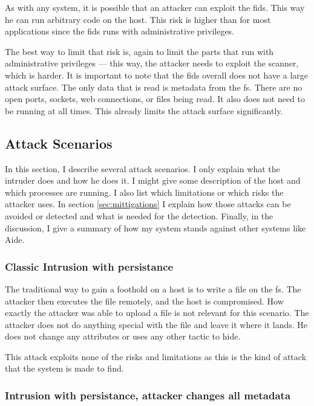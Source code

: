 As with any system, it is possible that an attacker can exploit the \gls{fids}. This way he can run arbitrary code on the host. This risk is higher than for most applications since the \gls{fids} runs with administrative privileges.

The best way to limit that risk is, again to limit the parts that run with administrative privileges — this way, the attacker needs to exploit the scanner, which is harder. It is important to note that the \gls{fids} overall does not have a large attack surface. The only data that is read is metadata from the \gls{fs}. There are no open ports, sockets, web connections, or files being read. It also does not need to be running at all times. This already limits the attack surface significantly.

\subsection{Attack Scenarios}
\label{sec:attack_scenarios}

In this section, I describe several attack scenarios. I only explain what the intruder does and how he does it. I might give some description of the host and which processes are running. I also list which limitations or which risks the attacker uses. In section \ref{sec:mittigations} I explain how those attacks can be avoided or detected and what is needed for the detection. Finally, in the discussion, I give a summary of how my system stands against other systems like Aide. 

\subsubsection{Classic Intrusion with persistance}
\label{sec:attack:classic}

The traditional way to gain a foothold on a host is to write a file on the \gls{fs}. The attacker then executes the file remotely, and the host is compromised. How exactly the attacker was able to upload a file is not relevant for this scenario. The attacker does not do anything special with the file and leave it where it lands. He does not change any attributes or uses any other tactic to hide.

This attack exploits none of the risks and limitations as this is the kind of attack that the system is made to find. 

\subsubsection{Intrusion with persistance, attacker changes all metadata}
\label{sec:attack:changeattr}

